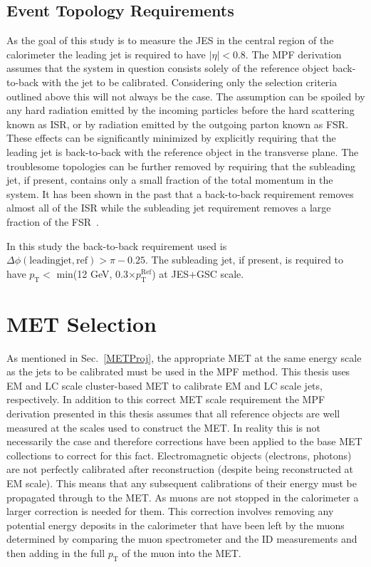 
\subsection{Event Topology Requirements}
\label{Sec:EventTopology}
As the goal of this study is to measure the \gls{JES} in the central region of the calorimeter the leading jet is required to have $\mid\eta\mid<$0.8.  
The MPF derivation assumes that the system in question consists solely of the reference object back-to-back with the jet to be calibrated.  
Considering only the selection criteria outlined above this will not always be the case.  
The assumption can be spoiled by any hard radiation emitted by the incoming particles before the hard scattering known as \gls{ISR}, or by radiation emitted by the outgoing parton known as \gls{FSR}.  
These effects can be significantly minimized by explicitly requiring that the leading jet is back-to-back with the reference object in the transverse plane.  
The troublesome topologies can be further removed by requiring that the subleading jet, if present, contains only a small fraction of the total momentum in the system.  
It has been shown in the past that a back-to-back requirement removes almost all of the ISR while the subleading jet requirement removes a large fraction of the FSR~\cite{DougPHD}.  

In this study the back-to-back requirement used is $\Delta \phi \left({\mathrm {leading jet, ref}}\right)>\pi-0.25$.  
The subleading jet, if present, is required to have $p_{\mathrm T}<$ min(12 GeV, 0.3$\times p_{\mathrm T}^{\mathrm {Ref}}$) at JES+GSC scale.  


\section{MET Selection}
As mentioned in Sec.~\ref{METProj}, the appropriate MET at the same energy scale as the jets to be calibrated must be used in the MPF method.  
This thesis uses EM and LC scale cluster-based MET to calibrate EM and LC scale jets, respectively.  
In addition to this correct MET scale requirement the MPF derivation presented in this thesis assumes that all reference objects are well measured at the scales used to construct the MET.  
In reality this is not necessarily the case and therefore corrections have been applied to the base MET collections to correct for this fact.  
Electromagnetic objects (electrons, photons) are not perfectly calibrated after reconstruction (despite being reconstructed at EM scale).  
This means that any subsequent calibrations of their energy must be propagated through to the MET.  
As muons are not stopped in the calorimeter a larger correction is needed for them.  
This correction involves removing any potential energy deposits in the calorimeter that have been left by the muons determined by comparing the muon spectrometer and the ID measurements and then adding in the full $p_{\mathrm T}$ of the muon into the MET.  



